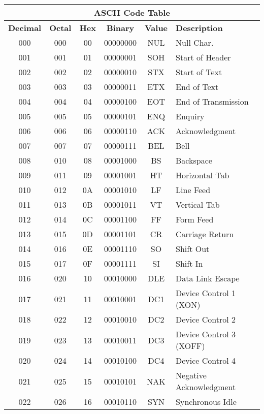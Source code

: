 \documentclass{article}
\begin{document}
\newpage
    \begin{longtable}{|c|c|c|c|c|l|}
       \hline
       \multicolumn{6}{|c|}{{\huge \textbf{ASCII Code Table}}} \\
       \hline 
       \textbf{Decimal} & \textbf{Octal} & \textbf{Hex} & \textbf{Binary} & \textbf{Value} & \textbf{Description}\\
       \hline
       000 & 000 & 00 & 00000000 & NUL & Null Char.\\
       001 & 001 & 01 & 00000001 & SOH & Start of Header\\
       002 & 002 & 02 & 00000010 & STX & Start of Text\\
       003 & 003 & 03 & 00000011 & ETX & End of Text\\
       004 & 004 & 04 & 00000100 & EOT & End of Transmission\\
       005 & 005 & 05 & 00000101 & ENQ & Enquiry\\
       006 & 006 & 06 & 00000110 & ACK & Acknowledgment\\
       007 & 007 & 07 & 00000111 & BEL & Bell\\
       008 & 010 & 08 & 00001000 & BS  & Backspace\\
       009 & 011 & 09 & 00001001 & HT  & Horizontal Tab\\
       010 & 012 & 0A & 00001010 & LF  & Line Feed\\
       011 & 013 & 0B & 00001011 & VT  & Vertical Tab\\
       012 & 014 & 0C & 00001100 & FF  & Form Feed\\
       013 & 015 & 0D & 00001101 & CR  & Carriage Return\\
       014 & 016 & 0E & 00001110 & SO  & Shift Out\\
       015 & 017 & 0F & 00001111 & SI  & Shift In\\
       016 & 020 & 10 & 00010000 & DLE & Data Link Escape\\
       017 & 021 & 11 & 00010001 & DC1 & Device Control 1 (XON)\\
       018 & 022 & 12 & 00010010 & DC2 & Device Control 2\\
       019 & 023 & 13 & 00010011 & DC3 & Device Control 3 (XOFF)\\
       020 & 024 & 14 & 00010100 & DC4 & Device Control 4\\
       021 & 025 & 15 & 00010101 & NAK & Negative Acknowledgment\\
       022 & 026 & 16 & 00010110 & SYN & Synchronous Idle\\

\end{longtable}
\end{document}
